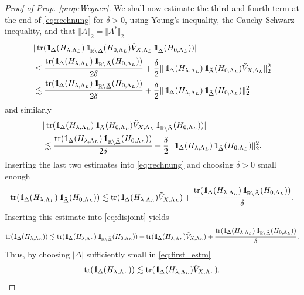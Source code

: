 \documentclass[reqno,12pt,letterpaper]{amsart}
\newcommand{\RR}{{\mathbb R}}
\numberwithin{equation}{section}
\DeclareMathOperator{\tr}{tr}
\def\indic{\operatorname{1\hskip-2.75pt\relax l}}
\begin{document}
\begin{proof}[Proof of Prop. \ref{prop:Wegner}]
We shall now estimate the third and fourth term at the end of \eqref{eq:rechnung} for $\delta>0$, using Young's inequality, the Cauchy-Schwarz inequality, and that $\Vert A \Vert_2 = \Vert A^*\Vert_2$
\[ \begin{split}
&\vert \tr(\indic_{\Delta}(H_{\lambda,\Lambda_L})\indic_{\RR\setminus\tilde \Delta}(H_{0,\Lambda_L}) \tilde V_{X,\Lambda_L}  \indic_{\tilde \Delta}(H_{0,\Lambda_L}) ) \vert\\
& \le \frac{\tr(\indic_{\Delta}(H_{\lambda,\Lambda_L})\indic_{\RR\setminus\tilde \Delta}(H_{0,\Lambda_L}))}{2\delta} + \frac{\delta}{2} \Vert \indic_{\Delta}(H_{\lambda,\Lambda_L})  \indic_{\tilde \Delta}(H_{0,\Lambda_L}) \tilde V_{X,\Lambda_L} \Vert_2^2 \\
& \lesssim \frac{\tr(\indic_{\Delta}(H_{\lambda,\Lambda_L})\indic_{\RR\setminus\tilde \Delta}(H_{0,\Lambda_L}))}{2\delta} + \frac{\delta}{2} \Vert \indic_{\Delta}(H_{\lambda,\Lambda_L})  \indic_{\tilde \Delta}(H_{0,\Lambda_L})\Vert_2^2
\end{split}\]
and similarly 
\[ \begin{split}
&\vert \tr(\indic_{\Delta}(H_{\lambda,\Lambda_L}) \indic_{\tilde \Delta}(H_{0,\Lambda_L}) \tilde V_{X,\Lambda_L} \indic_{\RR\setminus\tilde \Delta}(H_{0,\Lambda_L}) ) \vert\\
& \lesssim \frac{\tr(\indic_{\Delta}(H_{\lambda,\Lambda_L})\indic_{\RR\setminus\tilde \Delta}(H_{0,\Lambda_L}))}{2\delta} + \frac{\delta}{2} \Vert \indic_{\Delta}(H_{\lambda,\Lambda_L})  \indic_{\tilde \Delta}(H_{0,\Lambda_L})\Vert_2^2.
\end{split}\]
Inserting the last two estimates into \eqref{eq:rechnung} and choosing $\delta>0$ small enough
\[  \tr(\indic_{\Delta}(H_{\lambda,\Lambda_L})\indic_{\tilde \Delta}(H_{0,\Lambda_L})) \lesssim \tr(\indic_{\Delta}(H_{\lambda,\Lambda_L})\tilde V_{X,\Lambda_L} ) +\frac{\tr(\indic_{\Delta}(H_{\lambda,\Lambda_L})\indic_{\RR\setminus\tilde \Delta}(H_{0,\Lambda_L}))}{\delta}.\]
Inserting this estimate into \eqref{eq:disjoint} yields
\[\tr(\indic_{\Delta}(H_{\lambda,\Lambda_L}) ) \lesssim \tr(\indic_{\Delta}(H_{\lambda,\Lambda_L}) \indic_{\RR \setminus \tilde \Delta}(H_{0,\Lambda_L}) ) + \tr(\indic_{\Delta}(H_{\lambda,\Lambda_L})\tilde V_{X,\Lambda_L} ) +\frac{\tr(\indic_{\Delta}(H_{\lambda,\Lambda_L})\indic_{\RR\setminus\tilde \Delta}(H_{0,\Lambda_L}))}{\delta}.\]
Thus, by choosing $\vert \Delta \vert$ sufficiently small in \eqref{eq:first_estm}
\[ \tr(\indic_{\Delta}(H_{\lambda,\Lambda_L})) \lesssim \tr(\indic_{\Delta}(H_{\lambda,\Lambda_L})\tilde V_{X,\Lambda_L} ).\]


\end{proof}
\end{document}
